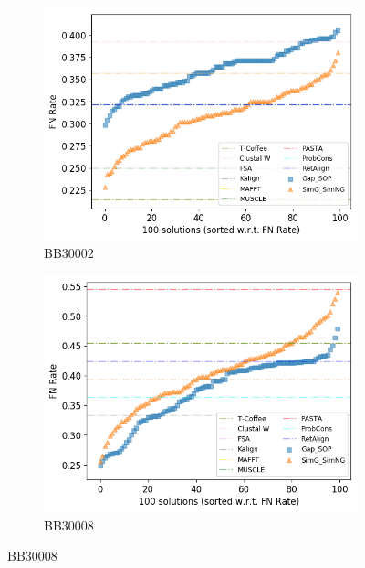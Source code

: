 \begin{figure}[!htbp]
	
	\begin{adjustwidth}{-1cm}{-1cm}
		\centering
		\begin{subfigure}{0.22\textwidth}
			\includegraphics[width=\columnwidth]{Figure/summary/precomputedInit/Balibase/BB30002_fnrate_density_single_run}
			\caption{BB30002}
		\end{subfigure}	
		\begin{subfigure}{0.22\textwidth}
			\includegraphics[width=\columnwidth]{Figure/summary/precomputedInit/Balibase/BB30008_fnrate_density_single_run}
			\caption{BB30008}

\end{subfigure}
\end{adjustwidth}
\end{figure}
